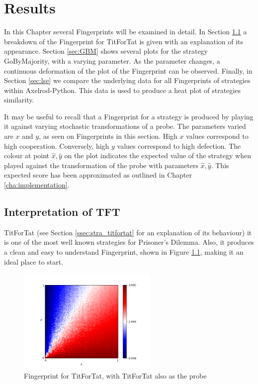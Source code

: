 
\chapter{Results}\label{cha:results}

In this Chapter several Fingerprints will be examined in detail.
In Section \ref{sec:tft} a breakdown of the Fingerprint for TitForTat is given with an explanation of its appearance.
Section \ref{sec:GBM} shows several plots for the strategy GoByMajority, with a varying parameter.
As the parameter changes, a continuous deformation of the plot of the
Fingerprint can be observed.
Finally, in Section \ref{sec:lse} we compare the underlying data for all Fingerprints of strategies within Axelrod-Python.
This data is used to produce a heat plot of strategies similarity.

It may be useful to recall that a Fingerprint for a strategy is produced by playing it against varying stochastic transformations of a probe.
The parameters varied are $x$ and $y$, as seen on Fingerprints in this section.
High $x$ values correspond to high cooperation.
Conversely, high $y$ values correspond to high defection.
The colour at point $\hat{x}, \hat{y}$ on the plot indicates the expected value of the strategy when played against the transformation of the probe with parameters $\hat{x}, \hat{y}$.
This expected score has been approximated as outlined in Chapter \ref{cha:implementation}.



\section{Interpretation of TFT}\label{sec:tft}
TitForTat (see Section \ref{ssec:stra_titfortat} for an explanation of its behaviour) it is one of the most well known strategies for Prisoner's Dilemma.
Also, it produces a clean and easy to understand Fingerprint, shown in Figure \ref{fig:TFT}, making it an ideal place to start.

\begin{figure}[hbtp!]
\centering
\includegraphics[width = 0.6\textwidth]{../img/Numerical/Tit_For_Tat.png}
\caption{Fingerprint for TitForTat, with TitForTat also as the probe}
\label{fig:TFT}
\end{figure}

